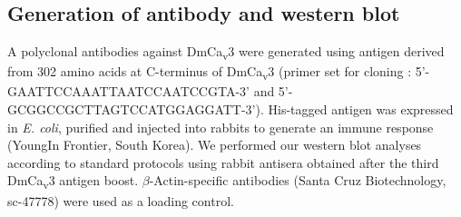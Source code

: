 \subsection*{Generation of antibody and western blot}

A polyclonal antibodies against DmCa\textsubscript{v}3 were generated using antigen derived from 302 amino acids at C-terminus of DmCa\textsubscript{v}3 (primer set for cloning : 5'-GAATTCCAAATTAATCCAATCCGTA-3' and 5'-GCGGCCGCTTAGTCCATGGAGGATT-3'). 
His-tagged antigen was expressed in \emph{E. coli}, purified and injected into rabbits to generate an immune response (YoungIn Frontier, South Korea).
We performed our western blot analyses according to standard protocols using rabbit antisera obtained after the third DmCa\textsubscript{v}3 antigen boost. $\beta$-Actin-specific antibodies (Santa Cruz Biotechnology, sc-47778) were used as a loading control.
